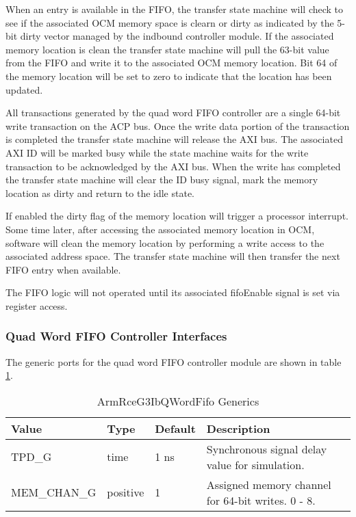 \documentclass[11pt]{article}
\begin{document}
When an entry is available in the FIFO, the transfer state machine will check to see if the associated OCM memory space
is clearn or dirty as indicated by the 5-bit dirty vector managed by the indbound controller module. If the associated memory location 
is clean the transfer state machine will pull the 63-bit value from the FIFO and write it to the associated OCM memory location. Bit 64
of the memory location will be set to zero to indicate that the location has been updated.

All transactions generated by the quad word FIFO controller are a single 64-bit write transaction on the ACP bus. Once the write data portion
of the transaction is completed the transfer state machine will release the AXI bus. The associated AXI ID will be marked busy while the state 
machine waits for the write transaction to be acknowledged by the AXI bus.  When the write has completed the transfer state machine will clear 
the ID busy signal, mark the memory location as dirty and return to the idle state. 

If enabled the dirty flag of the memory location will trigger a processor interrupt. Some time later, after accessing the associated memory location 
in OCM, software will clean the memory location by performing a write access to the associated address space. The transfer state machine will
then transfer the next FIFO entry when available.

The FIFO logic will not operated until its associated fifoEnable signal is set via register access.

\subsubsection{Quad Word FIFO Controller Interfaces}

The generic ports for the quad word FIFO controller module are shown in table \ref{tab:qword_cntrl_generics}.

\begin{table}[H]
\small
\centering
   \begin{tabular}{| l | l | l | l | }
      \hline \textbf{Value} & \textbf{Type} & \textbf{Default} & \textbf{Description} \\
      \hline TPD\_G          & time     & 1 ns & Synchronous signal delay value for simulation.    \\
      \hline MEM\_CHAN\_G    & positive & 1    & Assigned memory channel for 64-bit writes. 0 - 8. \\
      \hline
   \end{tabular}
   \caption{ArmRceG3IbQWordFifo Generics}
   \label{tab:qword_cntrl_generics}
\end{table}
\end{document}
